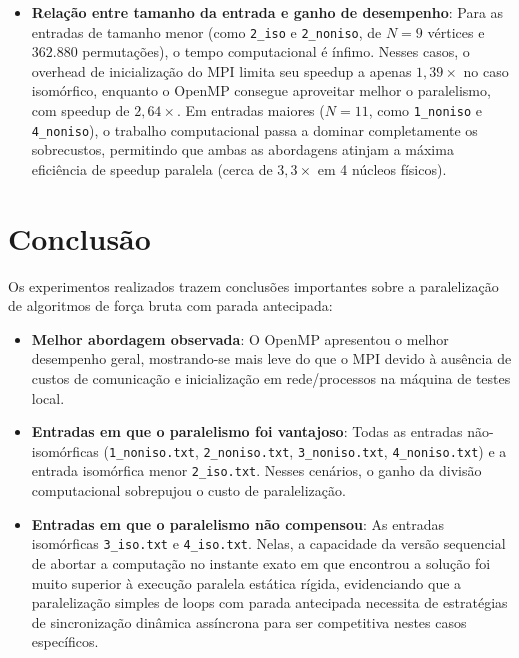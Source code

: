 \documentclass[12pt,a4paper]{article}
\begin{document}
\begin{itemize}
    \item \textbf{Relação entre tamanho da entrada e ganho de desempenho}:
    Para as entradas de tamanho menor (como \texttt{2\_iso} e \texttt{2\_noniso},
    de $N=9$ vértices e $362.880$ permutações),
    o tempo computacional é ínfimo.
    Nesses casos,
    o overhead de inicialização do MPI limita seu speedup a apenas $1,39\times$ no caso isomórfico,
    enquanto o OpenMP consegue aproveitar melhor o paralelismo,
    com speedup de $2,64\times$.
    Em entradas maiores ($N=11$,
    como \texttt{1\_noniso} e \texttt{4\_noniso}),
    o trabalho computacional passa a dominar completamente os sobrecustos,
    permitindo que ambas as abordagens atinjam a máxima eficiência de speedup paralela (cerca de $3,3\times$ em 4 núcleos físicos).
\end{itemize}

\section{Conclusão}

Os experimentos realizados trazem conclusões importantes sobre a paralelização de algoritmos de força bruta com parada antecipada:

\begin{itemize}
    \item \textbf{Melhor abordagem observada}:
    O OpenMP apresentou o melhor desempenho geral,
    mostrando-se mais leve do que o MPI devido à ausência de custos de comunicação e inicialização em rede/processos na máquina de testes local.
    \item \textbf{Entradas em que o paralelismo foi vantajoso}:
    Todas as entradas não-isomórficas (\texttt{1\_noniso.txt},
    \texttt{2\_noniso.txt},
    \texttt{3\_noniso.txt},
    \texttt{4\_noniso.txt}) e a entrada isomórfica menor \texttt{2\_iso.txt}.
    Nesses cenários,
    o ganho da divisão computacional sobrepujou o custo de paralelização.
    \item \textbf{Entradas em que o paralelismo não compensou}:
    As entradas isomórficas \texttt{3\_iso.txt} e \texttt{4\_iso.txt}.
    Nelas,
    a capacidade da versão sequencial de abortar a computação no instante exato em que encontrou a solução foi muito superior à execução paralela estática rígida,
    evidenciando que a paralelização simples de loops com parada antecipada necessita de estratégias de sincronização dinâmica assíncrona para ser competitiva nestes casos específicos.
\end{itemize}
\end{document}
